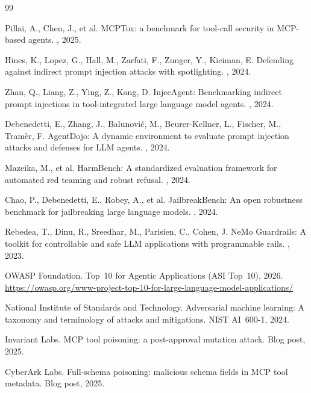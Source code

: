 \begin{thebibliography}{99}\small

Pillai, A., Chen, J., et al.
\newblock MCPTox: a benchmark for tool-call security in MCP-based agents.
, 2025.

Hines, K., Lopez, G., Hall, M., Zarfati, F., Zunger, Y., Kiciman, E.
\newblock Defending against indirect prompt injection attacks with
spotlighting.
, 2024.

Zhan, Q., Liang, Z., Ying, Z., Kang, D.
\newblock InjecAgent: Benchmarking indirect prompt injections in
tool-integrated large language model agents.
, 2024.

Debenedetti, E., Zhang, J., Balunovi\'c, M., Beurer-Kellner, L.,
Fischer, M., Tram\`er, F.
\newblock AgentDojo: A dynamic environment to evaluate prompt
injection attacks and defenses for LLM agents.
, 2024.

Mazeika, M., et al.
\newblock HarmBench: A standardized evaluation framework for
automated red teaming and robust refusal.
, 2024.

Chao, P., Debenedetti, E., Robey, A., et al.
\newblock JailbreakBench: An open robustness benchmark for
jailbreaking large language models.
, 2024.

Rebedea, T., Dinu, R., Sreedhar, M., Parisien, C., Cohen, J.
\newblock NeMo Guardrails: A toolkit for controllable and safe LLM
applications with programmable rails.
, 2023.

OWASP Foundation.
\newblock Top~10 for Agentic Applications (ASI Top~10), 2026.
\newblock \url{https://owasp.org/www-project-top-10-for-large-language-model-applications/}

National Institute of Standards and Technology.
\newblock Adversarial machine learning: A taxonomy and terminology
of attacks and mitigations. NIST AI~600-1, 2024.

Invariant Labs.
\newblock MCP tool poisoning: a post-approval mutation attack.
Blog post, 2025.

CyberArk Labs.
\newblock Full-schema poisoning: malicious schema fields in MCP
tool metadata. Blog post, 2025.


\end{thebibliography}
